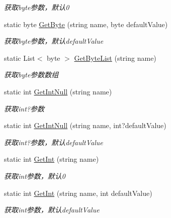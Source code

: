 \begin{DoxyCompactItemize}
\begin{DoxyCompactList}\small\item\em 获取byte参数，默认0 \end{DoxyCompactList}\item 
static byte \hyperlink{class_x_c_l_net_tools_1_1_string_hander_1_1_form_helper_aa1090c02b273fe23de21755a7b574a08}{Get\-Byte} (string name, byte default\-Value)
\begin{DoxyCompactList}\small\item\em 获取byte参数，默认default\-Value \end{DoxyCompactList}\item 
static List$<$ byte $>$ \hyperlink{class_x_c_l_net_tools_1_1_string_hander_1_1_form_helper_a575a372579f530e8fa7bce9a7808cf7f}{Get\-Byte\-List} (string name)
\begin{DoxyCompactList}\small\item\em 获取byte参数数组 \end{DoxyCompactList}\item 
static int \hyperlink{class_x_c_l_net_tools_1_1_string_hander_1_1_form_helper_a5f6d473bbc50e60cbd6c5015c1d4b010}{Get\-Int\-Null} (string name)
\begin{DoxyCompactList}\small\item\em 获取int?参数 \end{DoxyCompactList}\item 
static int \hyperlink{class_x_c_l_net_tools_1_1_string_hander_1_1_form_helper_a91af563c9654d78b004215b0d8cc5338}{Get\-Int\-Null} (string name, int?default\-Value)
\begin{DoxyCompactList}\small\item\em 获取int?参数，默认default\-Value \end{DoxyCompactList}\item 
static int \hyperlink{class_x_c_l_net_tools_1_1_string_hander_1_1_form_helper_ad3bcc9178dfa1bdc2d0e459b95d56fb4}{Get\-Int} (string name)
\begin{DoxyCompactList}\small\item\em 获取int参数，默认0 \end{DoxyCompactList}\item 
static int \hyperlink{class_x_c_l_net_tools_1_1_string_hander_1_1_form_helper_ab1cbc4a5f6643c60beaf928081457b6f}{Get\-Int} (string name, int default\-Value)
\begin{DoxyCompactList}\small\item\em 获取int参数，默认default\-Value \end{DoxyCompactList}\item 

\end{DoxyCompactItemize}

